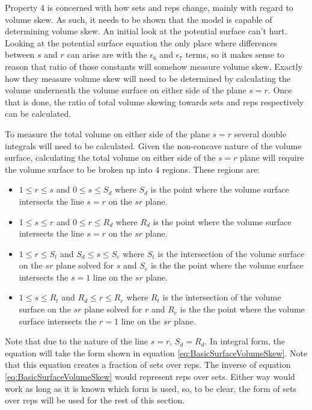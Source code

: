 Property 4 is concerned with how sets and reps change, mainly with regard to volume skew. As such, it needs to be shown that the model is capable of determining volume skew. An initial look at the potential surface can't hurt. Looking at the potential surface equation the only place where differences between $s$ and $r$ can arise are with the $\epsilon_6$ and $\epsilon_7$ terms, so it makes sense to reason that ratio of those constants will somehow measure volume skew. Exactly how they measure volume skew will need to be determined by calculating the volume underneath the volume surface on either side of the plane $s=r$. Once that is done, the ratio of total volume skewing towards sets and reps respectively can be calculated. 

To measure the total volume on either side of the plane $s=r$ several double integrals will need to be calculated. Given the non-concave nature of the volume surface, calculating the total volume on either side of the $s=r$ plane will require the volume surface to be broken up into $4$ regions. These regions are:

\begin{itemize}
	\item $1\le r\le s$ and $0\le s \le S_d$ where $S_d$ is the point where the volume surface intersects the line $s=r$ on the $sr$ plane.
	\item $1\le s\le r$ and $0\le r \le R_d$ where $R_d$ is the point where the volume surface intersects the line $s=r$ on the $sr$ plane.
	\item $1\le r\le S_t$ and $S_d \le s\le S_e$ where $S_t$ is the intersection of the volume surface on the $sr$ plane solved for $s$ and $S_e$ is the the point where the volume surface intersects the $s=1$ line on the $sr$ plane.
	\item $1\le s\le R_t$ and $R_d \le r\le R_e$ where $R_t$ is the intersection of the volume surface on the $sr$ plane solved for $r$ and $R_e$ is the the point where the volume surface intersects the $r=1$ line on the $sr$ plane.
\end{itemize}

Note that due to the nature of the line $s=r$, $S_d=R_d$. In integral form, the equation will take the form shown in equation \ref{eq:BasicSurfaceVolumeSkew}. Note that this equation creates a fraction of sets over reps. The inverse of equation \ref{eq:BasicSurfaceVolumeSkew} would represent reps over sets. Either way would work as long as it is known which form is used, so, to be clear, the form of sets over reps will be used for the rest of this section.

